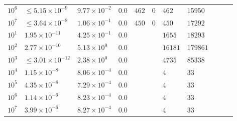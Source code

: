 \begin{tabularx}{\textwidth}{l l X X X X X X X X X}
    $10^6$  &  $\leq 5.15 \times 10^{-9}$  &  $9.77 \times 10^{-2}$  &  $0.0$  &  $462$  &  $0$  &  $462$  &  $15950$  & & & \\ 
    $10^7$  &  $\leq 3.64 \times 10^{-8}$  &  $1.06 \times 10^{-1}$  &  $0.0$  &  $450$  &  $0$  &  $450$  &  $17292$  & & & \\ 
\hline \hline
$10^1$  &  $1.95 \times 10^{-11}$  &  $4.25 \times 10^{-1}$ & $0.0$ &  &  & $1655$ & $18293$ & & & \\ 
$10^2$  &  $2.77 \times 10^{-10}$  &  $5.13 \times 10^{0}$ & $0.0$ &  &  & $16181$ & $179861$ & & & \\ 
$10^3$  &  $\leq 3.01 \times 10^{-12}$  &  $2.38 \times 10^{0}$ & $0.0$ &  &  & $4735$ & $85338$ & & & \\ 
$10^4$  &  $1.15 \times 10^{-8}$  &  $8.06 \times 10^{-4}$ & $0.0$ &  &  & $4$ & $33$ & & & \\ 
$10^5$  &  $4.35 \times 10^{-8}$  &  $7.29 \times 10^{-4}$ & $0.0$ &  &  & $4$ & $33$ & & & \\ 
$10^6$  &  $1.14 \times 10^{-6}$  &  $8.23 \times 10^{-4}$ & $0.0$ &  &  & $4$ & $33$ & & & \\ 
$10^7$  &  $3.99 \times 10^{-6}$  &  $8.27 \times 10^{-4}$ & $0.0$ &  &  & $4$ & $33$ & & & \\ 
\end{tabularx}
